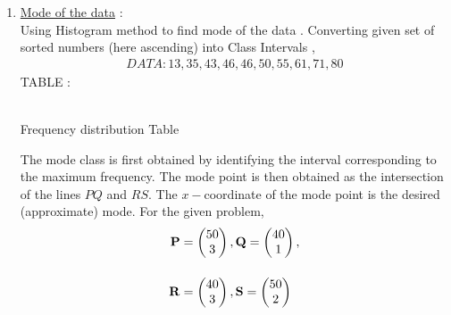 \documentclass[journal,12pt,twocolumn]{IEEEtran}
\begin{document}
\begin{flushleft}
\begin{enumerate}
\item \underline{Mode of the data} :\\[6pt]
Using Histogram method to find mode of the data .
Converting given set of sorted numbers (here ascending) into Class Intervals ,\\[6pt]
	\begin{align}
		DATA : 13, 35, 43, 46, 46, 50, 55, 61, 71, 80
	\end{align}
TABLE :
	\begin{table}[H]
			\def\arraystretch{1.5}    		
    		\centering
				\\[6pt]
    		\caption{Frequency distribution Table}
    			\label{Table 1}
	\end{table}
The mode class is first obtained by identifying the interval corresponding to the maximum frequency. The mode point is then obtained as the intersection of the lines $PQ$ and $RS$. The $x-$coordinate of the mode point is the desired (approximate) mode. For the
given problem,\\
	\begin{align}
		\mathbf{P} &= \begin{pmatrix}50 \\ 3\end{pmatrix},
		\mathbf{Q} = \begin{pmatrix}40 \\ 1\end{pmatrix},\\[12pt]
		\mathbf{R} &= \begin{pmatrix}40 \\ 3\end{pmatrix},
		\mathbf{S} = \begin{pmatrix}50 \\ 2\end{pmatrix}
 	\end{align} 


\end{enumerate}
\end{flushleft}
\end{document}
